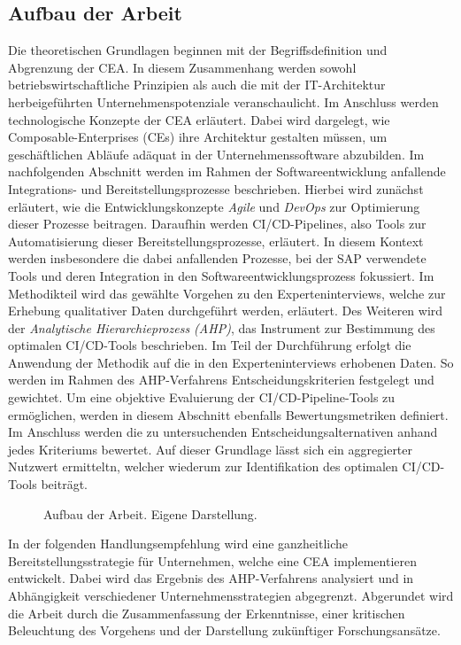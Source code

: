 \subsection{Aufbau der Arbeit}
Die theoretischen Grundlagen beginnen mit der Begriffsdefinition und Abgrenzung der CEA. In diesem Zusammenhang werden sowohl betriebswirtschaftliche Prinzipien als auch die mit der IT-Architektur herbeigeführten Unternehmenspotenziale veranschaulicht. Im Anschluss werden technologische Konzepte der CEA erläutert. Dabei wird dargelegt, wie Composable-Enterprises (\acs{CE}s) ihre Architektur gestalten müssen, um geschäftlichen Abläufe adäquat in der Unternehmenssoftware abzubilden. Im nachfolgenden Abschnitt werden im Rahmen der Softwareentwicklung anfallende Integrations- und Bereitstellungsprozesse beschrieben. Hierbei wird zunächst erläutert, wie die Entwicklungskonzepte \textit{Agile} und \textit{DevOps} zur Optimierung dieser Prozesse beitragen. Daraufhin werden CI/CD-Pipelines, also Tools zur Automatisierung dieser Bereitstellungsprozesse, erläutert. In diesem Kontext werden insbesondere die dabei anfallenden Prozesse, bei der SAP verwendete Tools und deren Integration in den Softwareentwicklungsprozess fokussiert. Im Methodikteil wird das gewählte Vorgehen zu den Experteninterviews, welche zur Erhebung qualitativer Daten durchgeführt werden, erläutert. Des Weiteren wird der \textit{Analytische Hierarchieprozess (\acs{AHP})}, das Instrument zur Bestimmung des optimalen CI/CD-Tools beschrieben. Im Teil der Durchführung erfolgt die Anwendung der Methodik auf die in den Experteninterviews erhobenen Daten. So werden im Rahmen des AHP-Verfahrens Entscheidungskriterien festgelegt und gewichtet. Um eine objektive Evaluierung der CI/CD-Pipeline-Tools zu ermöglichen, werden in diesem Abschnitt ebenfalls Bewertungsmetriken definiert. Im Anschluss werden die zu untersuchenden Entscheidungsalternativen anhand jedes Kriteriums bewertet. Auf dieser Grundlage lässt sich ein aggregierter Nutzwert ermitteltn, welcher wiederum zur Identifikation des optimalen CI/CD-Tools beiträgt. 
\begin{center}
	\begin{figure}[H]
		\centering
		\caption[Aufbau der Arbeit]{Aufbau der Arbeit. Eigene Darstellung.}
		\label{fig:Aufbau}
	\end{figure}	
\end{center}
\vspace*{-15mm}
In der folgenden Handlungsempfehlung wird eine ganzheitliche Bereitstellungsstrategie für Unternehmen, welche eine CEA implementieren entwickelt. Dabei wird das Ergebnis des AHP-Verfahrens analysiert und in Abhängigkeit verschiedener Unternehmensstrategien abgegrenzt. Abgerundet wird die Arbeit durch die Zusammenfassung der Erkenntnisse, einer kritischen Beleuchtung des Vorgehens und der Darstellung zukünftiger Forschungsansätze. 

